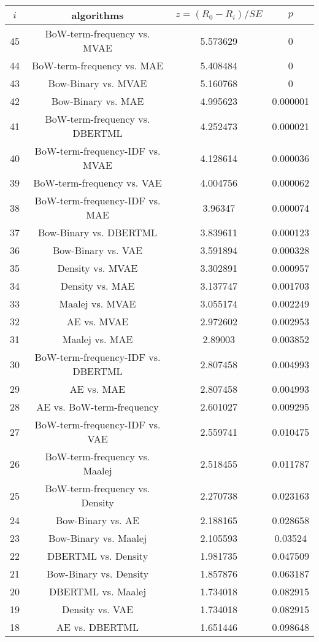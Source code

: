 \documentclass[a4paper,10pt]{article}
\begin{document}
\begin{landscape}
\begin{table}[!htp]
\centering\scriptsize
\begin{tabular}{cccc}
$i$&algorithms&$z=(R_0 - R_i)/SE$&$p$\\
\hline45&BoW-term-frequency vs. MVAE&5.573629&0\\
44&BoW-term-frequency vs. MAE&5.408484&0\\
43&Bow-Binary vs. MVAE&5.160768&0\\
42&Bow-Binary vs. MAE&4.995623&0.000001\\
41&BoW-term-frequency vs. DBERTML&4.252473&0.000021\\
40&BoW-term-frequency-IDF vs. MVAE&4.128614&0.000036\\
39&BoW-term-frequency vs. VAE&4.004756&0.000062\\
38&BoW-term-frequency-IDF vs. MAE&3.96347&0.000074\\
37&Bow-Binary vs. DBERTML&3.839611&0.000123\\
36&Bow-Binary vs. VAE&3.591894&0.000328\\
35&Density vs. MVAE&3.302891&0.000957\\
34&Density vs. MAE&3.137747&0.001703\\
33&Maalej vs. MVAE&3.055174&0.002249\\
32&AE vs. MVAE&2.972602&0.002953\\
31&Maalej vs. MAE&2.89003&0.003852\\
30&BoW-term-frequency-IDF vs. DBERTML&2.807458&0.004993\\
29&AE vs. MAE&2.807458&0.004993\\
28&AE vs. BoW-term-frequency&2.601027&0.009295\\
27&BoW-term-frequency-IDF vs. VAE&2.559741&0.010475\\
26&BoW-term-frequency vs. Maalej&2.518455&0.011787\\
25&BoW-term-frequency vs. Density&2.270738&0.023163\\
24&Bow-Binary vs. AE&2.188165&0.028658\\
23&Bow-Binary vs. Maalej&2.105593&0.03524\\
22&DBERTML vs. Density&1.981735&0.047509\\
21&Bow-Binary vs. Density&1.857876&0.063187\\
20&DBERTML vs. Maalej&1.734018&0.082915\\
19&Density vs. VAE&1.734018&0.082915\\
18&AE vs. DBERTML&1.651446&0.098648\\

\end{tabular}
\end{table}
\end{landscape}
\end{document}
